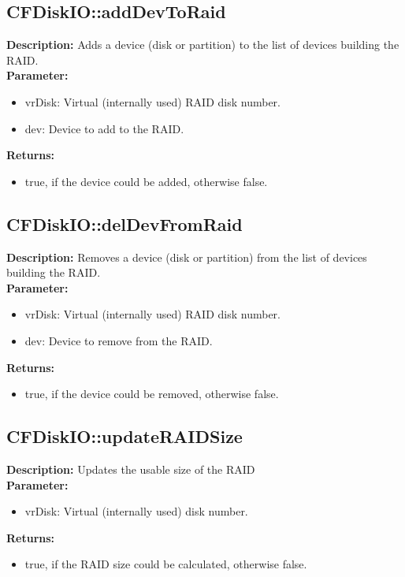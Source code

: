 \subsection{CFDiskIO::addDevToRaid}
\textbf{Description:} Adds a device (disk or partition) to the list of devices building the RAID.\\
\textbf{Parameter:}
\begin{itemize}
\item vrDisk: Virtual (internally used) RAID disk number.
\item dev: Device to add to the RAID.
\end{itemize}
\textbf{Returns:}
\begin{itemize}
\item true, if the device could be added, otherwise false.
\end{itemize}

\subsection{CFDiskIO::delDevFromRaid}
\textbf{Description:} Removes a device (disk or partition) from the list of devices building the RAID.\\
\textbf{Parameter:}
\begin{itemize}
\item vrDisk: Virtual (internally used) RAID disk number.
\item dev: Device to remove from the RAID.
\end{itemize}
\textbf{Returns:}
\begin{itemize}
\item true, if the device could be removed, otherwise false.
\end{itemize}

\subsection{CFDiskIO::updateRAIDSize}
\textbf{Description:} Updates the usable size of the RAID\\
\textbf{Parameter:}
\begin{itemize}
\item vrDisk: Virtual (internally used) disk number.
\end{itemize}
\textbf{Returns:}
\begin{itemize}
\item true, if the RAID size could be calculated, otherwise false.
\end{itemize}

